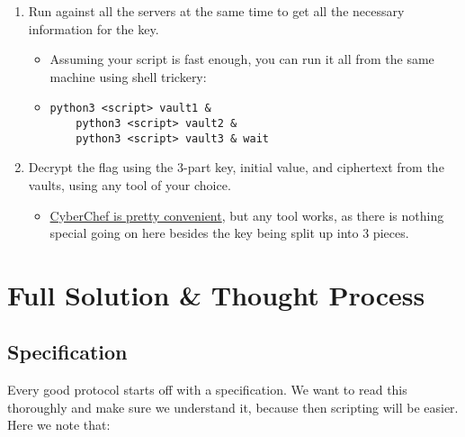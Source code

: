 \documentclass[11pt]{article}
\begin{document}
\begin{enumerate}
\begin{itemize}
        \end{itemize}
        \item Run against all the servers at the same time to get all the necessary information for the key.
        \begin{itemize}
            \item Assuming your script is fast enough, you can run it all from the same machine using shell trickery:
            \item \verb`python3 <script> vault1 &` \\
            \verb`    python3 <script> vault2 &` \\
            \verb`    python3 <script> vault3 & wait`
        \end{itemize}
        \item Decrypt the flag using the 3-part key, initial value, and ciphertext from the vaults, using any tool of your choice.
        \begin{itemize}
            \item \href{https://gchq.github.io/CyberChef}{CyberChef is pretty convenient}, but any tool works, as there is nothing special going on here besides the key being split up into 3 pieces.
        \end{itemize}
    \end{enumerate}

    \pagebreak


    \section{Full Solution \& Thought Process}\label{sec:full-solution-thought-process}

    \subsection{Specification}\label{subsec:specification}

    Every good protocol starts off with a specification. We want to read this thoroughly and make sure we understand it, because then scripting will be easier. Here we note that:
\end{document}
